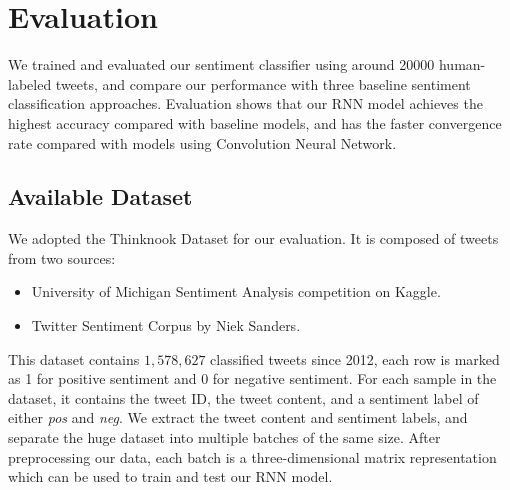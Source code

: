 

\section{Evaluation}
We trained and evaluated our sentiment classifier using around 20000 human-labeled tweets, and compare our performance with three baseline sentiment classification approaches.
%
Evaluation shows that our RNN model achieves the highest accuracy compared with baseline models, and has the faster convergence rate compared with models using Convolution Neural Network.
 
\subsection{Available Dataset}\label{subsec:data}
We adopted the Thinknook Dataset\cite{thinknookData} for our evaluation. 
It is composed of tweets from two sources: 
\begin{itemize} 
\item University of Michigan Sentiment Analysis competition on Kaggle\cite{kaggleData}.  
\item Twitter Sentiment Corpus by Niek Sanders\cite{sanderData}.   
\end{itemize} 
%
This dataset contains $1,578,627$ classified tweets since 2012, each row is marked as 1 for positive sentiment and 0 for negative sentiment. 
%
For each sample in the dataset, it contains the tweet ID, the tweet content, and a sentiment label of either \emph{pos} and \emph{neg}. 
%
We extract the tweet content and sentiment labels, and separate the huge dataset into multiple batches of the same size.
%
After preprocessing our data, each batch is a three-dimensional matrix representation which can be used to train and test our RNN model.

